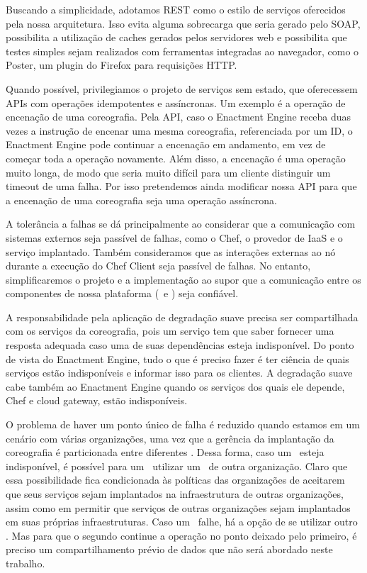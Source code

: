 Buscando a simplicidade, adotamos REST como o estilo de serviços oferecidos pela nossa arquitetura. Isso evita alguma sobrecarga que seria gerado pelo SOAP, possibilita a utilização de caches gerados pelos servidores web e possibilita que testes simples sejam realizados com ferramentas integradas ao navegador, como o Poster, um plugin do Firefox para requisições HTTP.

Quando possível, privilegiamos o projeto de serviços sem estado, que oferecessem APIs com operações idempotentes e assíncronas. Um exemplo é a operação de encenação de uma coreografia. Pela API, caso o Enactment Engine receba duas vezes a instrução de encenar uma mesma coreografia, referenciada por um ID, o Enactment Engine pode continuar a encenação em andamento, em vez de começar toda a operação novamente. Além disso, a encenação é uma operação muito longa, de modo que seria muito difícil para um cliente distinguir um timeout de uma falha. Por isso pretendemos ainda modificar nossa API para que a encenação de uma coreografia seja uma operação assíncrona.

A tolerância a falhas se dá principalmente ao considerar que a comunicação com sistemas externos seja passível de falhas, como o Chef, o provedor de IaaS e o serviço implantado. Também consideramos que as interações externas ao nó durante a execução do Chef Client seja passível de falhas. No entanto, simplificaremos o projeto e a implementação ao supor que a comunicação entre os componentes de nossa plataforma (\eecomp\ e \dm) seja confiável. 

A responsabilidade pela aplicação de degradação suave precisa ser compartilhada com os serviços da coreografia, pois um serviço tem que saber fornecer uma resposta adequada caso uma de suas dependências esteja indisponível. Do ponto de vista do Enactment Engine, tudo o que é preciso fazer é ter ciência de quais serviços estão indisponíveis e informar isso para os clientes. A degradação suave cabe também ao Enactment Engine quando os serviços dos quais ele depende, Chef e cloud gateway, estão indisponíveis.

O problema de haver um ponto único de falha é reduzido quando estamos em um cenário com várias organizações, uma vez que a gerência da implantação da coreografia é particionada entre diferentes . Dessa forma, caso um \dm\ esteja indisponível, é possível para um \eecomp\ utilizar um \dm\ de outra organização. Claro que essa possibilidade fica condicionada às políticas das organizações de aceitarem que seus serviços sejam implantados na infraestrutura de outras organizações, assim como em permitir que serviços de outras organizações sejam implantados em suas próprias infraestruturas. Caso um \eecomp\ falhe, há a opção de se utilizar outro \eecomp. Mas para que o segundo continue a operação no ponto deixado pelo primeiro, é preciso um compartilhamento prévio de dados que não será abordado neste trabalho. 

